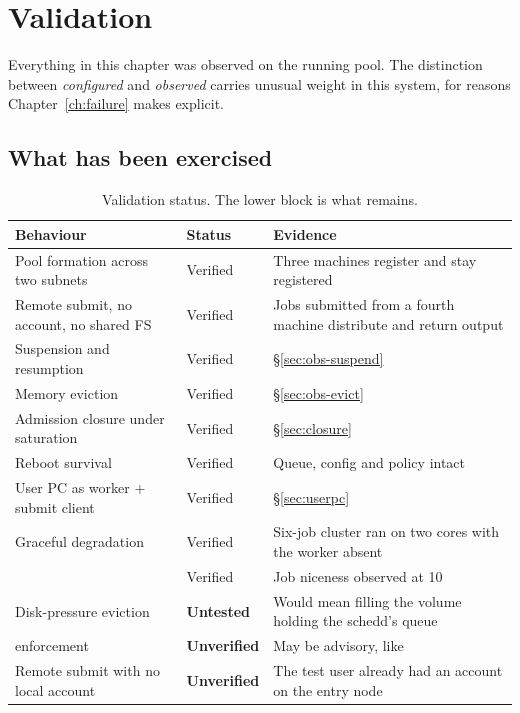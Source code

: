 \chapter{Validation}
\label{ch:validation}

Everything in this chapter was observed on the running pool. The distinction
between \emph{configured} and \emph{observed} carries unusual weight in this
system, for reasons Chapter~\ref{ch:failure} makes explicit.

\section{What has been exercised}

\begin{table}[H]
\centering
\begin{tabularx}{\textwidth}{L{0.34\textwidth} L{0.15\textwidth} Y}
\toprule
\textbf{Behaviour} & \textbf{Status} & \textbf{Evidence} \\
\midrule
Pool formation across two subnets & Verified & Three machines register and stay registered \\
Remote submit, no account, no shared FS & Verified & Jobs submitted from a fourth machine distribute and return output \\
Suspension and resumption & Verified & \S\ref{sec:obs-suspend} \\
Memory eviction & Verified & \S\ref{sec:obs-evict} \\
Admission closure under saturation & Verified & \S\ref{sec:closure} \\
Reboot survival & Verified & Queue, config and policy intact \\
User PC as worker + submit client & Verified & \S\ref{sec:userpc} \\
Graceful degradation & Verified & Six-job cluster ran on two cores with the worker absent \\
 & Verified & Job niceness observed at 10 \\
\midrule
Disk-pressure eviction & \textbf{Untested} & Would mean filling the volume holding the schedd's queue \\
 enforcement & \textbf{Unverified} & May be advisory, like  \\
Remote submit with no local account & \textbf{Unverified} & The test user already had an account on the entry node \\
\bottomrule
\end{tabularx}
\caption{Validation status. The lower block is what remains.}
\end{table}

